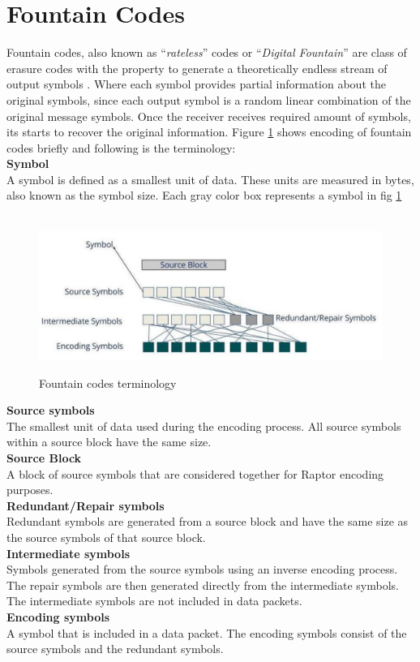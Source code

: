 \section{Fountain Codes}
Fountain codes, also known as \enquote{\textit{rateless}} codes or \enquote{\textit{Digital Fountain}} are class of erasure codes with the property to generate a theoretically endless stream of output symbols \cite{blahut1983theory} \cite{lin2004error}. Where each symbol provides partial information about the original symbols, since each output symbol is a random linear combination of the original message symbols. Once the receiver receives required amount of symbols, its starts to recover the original information. Figure \ref{fountain} shows encoding of fountain codes briefly and following is the terminology:\\
\textbf{Symbol}\\
A symbol is defined as a smallest unit of data. These units are measured in bytes, also known as the symbol size. Each gray color box represents a symbol in fig \ref{fountain}\\
\begin{figure}[h!]
\begin{center}
\mbox{
\includegraphics[width=5.8in]{Figures/fountain}}
\caption{Fountain codes terminology}
\label{fountain}
\end{center}
\end{figure}

\noindent
\textbf{Source symbols} \\
The smallest unit of data used during the encoding process. All source symbols within a source block have the same size. \\

\noindent
\textbf{Source Block}\\
A block of source symbols that are considered together for Raptor encoding purposes.\\
\textbf{Redundant/Repair symbols}\\
Redundant symbols are generated from a source block and have the same size as the source symbols of that source block.\\
\textbf{Intermediate symbols}\\
Symbols generated from the source symbols using an inverse encoding process. The repair symbols are then generated directly from the intermediate symbols. The intermediate symbols are not included in data packets.\\
\textbf{Encoding symbols}\\
A symbol that is included in a data packet.  The encoding symbols consist of the source symbols and the redundant symbols.

